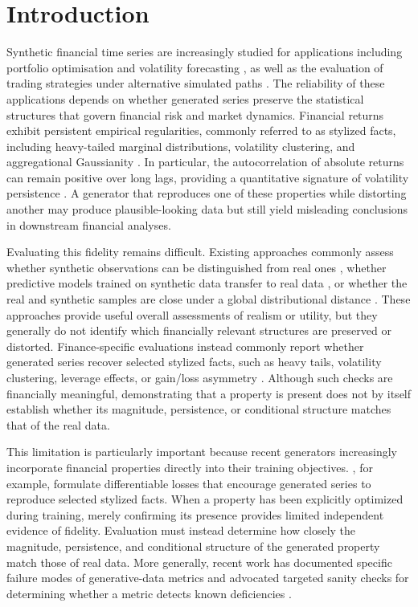 \section{Introduction}\label{sec:introduction}

Synthetic financial time series are increasingly studied for applications including portfolio optimisation and volatility forecasting \citep{hounwanou2025evaluating}, as well as the evaluation of trading strategies under alternative simulated paths \citep{zhang2026sfag}.
The reliability of these applications depends on whether generated series preserve the statistical structures that govern financial risk and market dynamics.
Financial returns exhibit persistent empirical regularities, commonly referred to as stylized facts, including heavy-tailed marginal distributions, volatility clustering, and aggregational Gaussianity \citep{cont2001empirical}.
In particular, the autocorrelation of absolute returns can remain positive over long lags, providing a quantitative signature of volatility persistence \citep{ding1993long}.
A generator that reproduces one of these properties while distorting another may produce plausible-looking data but still yield misleading conclusions in downstream financial analyses.

Evaluating this fidelity remains difficult.
Existing approaches commonly assess whether synthetic observations can be distinguished from real ones \citep{yoon2019timegan}, whether predictive models trained on synthetic data transfer to real data \citep{esteban2017realvalued}, or whether the real and synthetic samples are close under a global distributional distance \citep{gretton2012kernel}.
These approaches provide useful overall assessments of realism or utility, but they generally do not identify which financially relevant structures are preserved or distorted.
Finance-specific evaluations instead commonly report whether generated series recover selected stylized facts, such as heavy tails, volatility clustering, leverage effects, or gain/loss asymmetry \citep{takahashi2019modeling, tanaka2025cofindiff}.
Although such checks are financially meaningful, demonstrating that a property is present does not by itself establish whether its magnitude, persistence, or conditional structure matches that of the real data.

This limitation is particularly important because recent generators increasingly incorporate financial properties directly into their training objectives.
\citet{zhang2026sfag}, for example, formulate differentiable losses that encourage generated series to reproduce selected stylized facts.
When a property has been explicitly optimized during training, merely confirming its presence provides limited independent evidence of fidelity.
Evaluation must instead determine how closely the magnitude, persistence, and conditional structure of the generated property match those of real data.
More generally, recent work has documented specific failure modes of generative-data metrics and advocated targeted sanity checks for determining whether a metric detects known deficiencies \citep{raisa2025position}.

